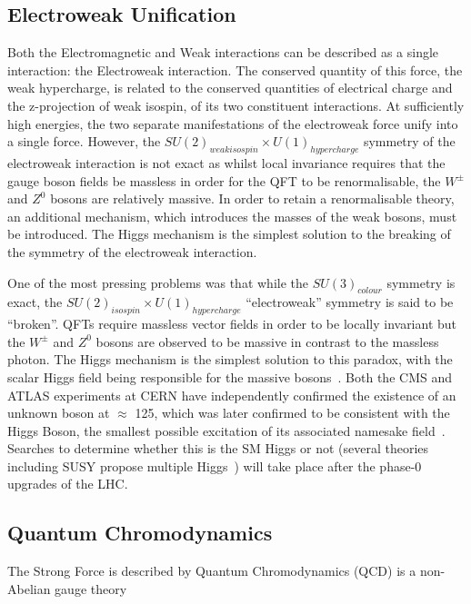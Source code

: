 \subsection{Electroweak Unification}\label{subsec:electroweak}
Both the Electromagnetic and Weak interactions can be described as a single interaction: the Electroweak interaction. 
The conserved quantity of this force, the weak hypercharge, is related to the conserved quantities of electrical charge and the z-projection of weak isospin, of its two constituent interactions. 
At sufficiently high energies, the two separate manifestations of the electroweak force unify into a single force. 
However, the $SU(2)_{weak isospin} \times U(1)_{hypercharge}$ symmetry of the electroweak interaction is not exact as whilst local invariance requires that the gauge boson fields be massless in order for the QFT to be renormalisable, the $W^{\pm}$ and $Z^{0}$ bosons are relatively massive. 
In order to retain a renormalisable theory, an additional mechanism, which introduces the masses of the weak bosons, must be introduced. 
The Higgs mechanism is the simplest solution to the breaking of the symmetry of the electroweak interaction\cite{LagrangiansSM}. 

One of the most pressing problems was that while the $SU(3)_{colour}$ symmetry is exact, the $SU(2)_{isospin} \times U(1)_{hypercharge}$ ``electroweak'' symmetry is said to be ``broken''. 
QFTs require massless vector fields in order to be locally invariant but the $W^{\pm}$ and $Z^{0}$ bosons are observed to be massive in contrast to the massless photon. 
The Higgs mechanism is the simplest solution to this paradox, with the scalar Higgs field being responsible for the massive bosons~\cite{oldcms}. 
Both the CMS and ATLAS experiments at CERN have independently confirmed the existence of an unknown boson at $\approx$ 125\GeV, which was later confirmed to be consistent with the Higgs Boson, the smallest possible excitation of its associated namesake field~\cite{HiggsCMS,HiggsATLAS}. 
Searches to determine whether this is the SM Higgs or not (several theories including SUSY propose multiple Higgs~\cite{Khalil:2003vd,Gianotti:2002xx}) will take place after the phase-0 upgrades of the LHC. 


\subsection{Quantum Chromodynamics}\label{subsec:QED}
The Strong Force is described by Quantum Chromodynamics (QCD) is a non-Abelian gauge theory

